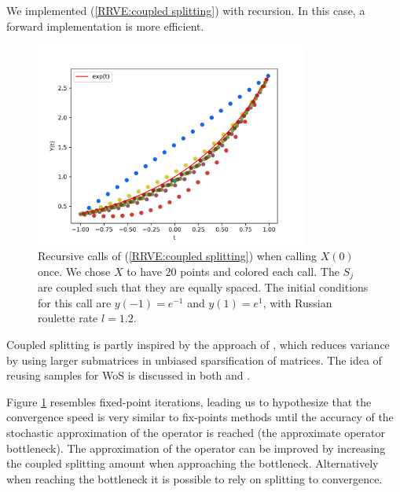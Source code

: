 \documentclass[a4paper,12pt]{article}
\begin{document}
\begin{pythonn} \label{py:coupled splitting}
    We implemented (\ref{RRVE:coupled splitting}) with recursion. In this case,
    a forward implementation is more efficient. \\

    \begin{figure}[h!]
        \centering
        \includegraphics[width=0.8\textwidth]{plots/coupled split.png}
        \caption{Recursive calls of (\ref{RRVE:coupled splitting}) when
        calling $X(0)$ once. We chose $X$ to have $20$ points and
        colored each call. The $S_{j}$ are coupled such that
        they are equally spaced.
        The initial conditions for this call are $y(-1)=e^{-1}$ and $y(1)=e^{1}$,
        with Russian roulette rate $l=1.2$. }
        \label{fig:coupled splitting}
    \end{figure}
\end{pythonn}

\begin{related}
    Coupled splitting is partly inspired by the approach
    of \cite{sabelfeld_sparsified_2009}, which reduces
    variance by using larger submatrices in unbiased sparsification
    of matrices. The idea
    of reusing samples for WoS is discussed in both
    \cite{miller_boundary_2023} and \cite{bakbouk_mean_2023}.
\end{related}

Figure \ref{fig:coupled splitting}
resembles fixed-point iterations, leading us to hypothesize
that the convergence
speed is very similar to fix-points methods until the accuracy
of the stochastic approximation of the operator is reached
(the approximate operator bottleneck). The approximation of the operator
can be improved by increasing the coupled splitting amount when
approaching the bottleneck. Alternatively when reaching
the bottleneck it is possible to rely on splitting to convergence.
\end{document}

